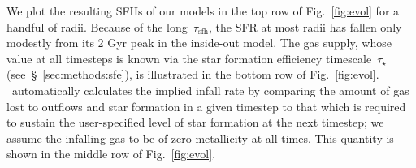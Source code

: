 \documentclass[draft2.tex]{subfiles}
\begin{document}
We plot the resulting SFHs of our models in the top row of Fig.~\ref{fig:evol} 
for a handful of radii. 
Because of the long~$\tau_\text{sfh}$, the SFR at most radii has fallen only 
modestly from its 2 Gyr peak in the inside-out model. 
The gas supply, whose value at all timesteps is known via the star formation 
efficiency timescale~$\tau_\star$ (see~\S~\ref{sec:methods:sfe}), is 
illustrated in the bottom row of Fig.~\ref{fig:evol}. 
\vice~automatically calculates the implied infall rate by comparing the amount 
of gas lost to outflows and star formation in a given timestep to that which is 
required to sustain the user-specified level of star formation at the next 
timestep; we assume the infalling gas to be of zero metallicity at all times. 
This quantity is shown in the middle row of Fig.~\ref{fig:evol}. 
\end{document}
